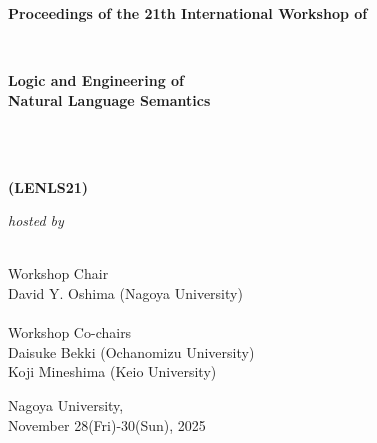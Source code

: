 \documentclass[12pt]{jarticle}
\begin{document}
\pagestyle{empty}

\vspace*{1cm}

\begin{center}

\begin{Large}
{\bf Proceedings of the 21th International Workshop of}
\end{Large} 
\\
\begin{huge}
{\bf Logic and Engineering of \\
Natural Language Semantics} 
\end{huge}
\\\ \\
\begin{huge}
{\bf (LENLS21)}
\end{huge}

\vspace*{1cm}

\begin{Large}
{\em hosted by \\\ \\ }
\end{Large}

\begin{large}
\vspace*{1cm}
Workshop Chair\\ $\;$\\
David Y. Oshima (Nagoya University) \\
\ \\
Workshop Co-chairs\\ $\;$\\
Daisuke Bekki (Ochanomizu University) \\
Koji Mineshima (Keio University) \\

\end{large}

\vspace*{3cm}


\vspace*{1cm}

\begin{large}
Nagoya University, \\
November 28(Fri)-30(Sun), 2025
\end{large}
\vfill

\end{center}
\end{document}
